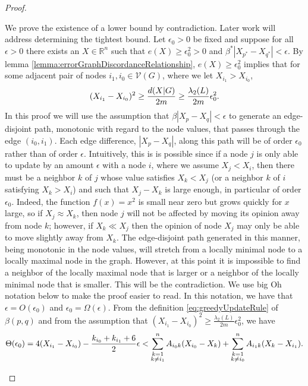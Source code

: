 \documentclass{article}
\theoremstyle{remark}
\newcommand{\R}[0]{\mathbb{R}}
\begin{document}
\begin{proof}
\begin{enumerate}
			We prove the existence of a lower bound by contradiction. Later work will address determining the tightest bound. Let $\epsilon_0>0$ be fixed and suppose for all $\epsilon>0$ there exists an $X\in\R^n$ such that $e(X)\geq\epsilon_0^2>0$ and $\beta^*|X_{p^*}-X_{q^*}|<\epsilon$. By lemma \ref{lemma:errorGraphDiscordanceRelationship}, $e(X)\geq\epsilon_0^2$ implies that for some adjacent pair of nodes $i_1,i_0\in\mathcal{V}(G)$, where we let $X_{i_1}>X_{i_0}$,
			\begin{equation}{\label{eq:lowerboundOnDiff}}
				(X_{i_1}-X_{i_0})^2 \geq \frac{d(X|G)}{2m}\geq\frac{\lambda_2(L)}{2m}\epsilon_0^2.
			\end{equation}
			In this proof we will use the assumption that $\beta|X_p-X_q|<\epsilon$ to generate an edge-disjoint path, monotonic with regard to the node values, that passes through the edge $(i_0,i_1)$. Each edge difference, $|X_p-X_q|$, along this path will be of order $\epsilon_0$ rather than of order $\epsilon$. Intuitively, this is is possible since if a node $j$ is only able to update by an amount $\epsilon$ with a node $i$, where we assume $X_j<X_i$, then there must be a neighbor $k$ of $j$ whose value satisfies $X_k<X_j$ (or a neighbor $k$ of $i$ satisfying $X_k>X_i$) and such that $X_j-X_k$ is large enough, in particular of order $\epsilon_0$. Indeed, the function $f(x)=x^2$ is small near zero but grows quickly for $x$ large, so if $X_j\approx X_k$, then node $j$ will not be affected by moving its opinion away from node $k$; however, if $X_k\ll X_j$ then the opinion of node $X_j$ may only be able to move slightly away from $X_k$. The edge-disjoint path generated in this manner, being monotonic in the node values, will stretch from a locally minimal node to a locally maximal node in the graph. However, at this point it is impossible to find a neighbor of the locally maximal node that is larger or a neighbor of the locally minimal node that is smaller. This will be the contradiction.
			We use big Oh notation below to make the proof easier to read.  In this notation, we have that $\epsilon = O(\epsilon_0)$ and $\epsilon_0 = \Omega(\epsilon)$. From the definition \ref{eq:greedyUpdateRule} of $\beta(p,q)$ and from the assumption that $(X_{i_1}-X_{i_0})^2\geq \frac{\lambda_{2}(L)}{2m}\epsilon_0^2$, we have
			\begin{equation}{\label{eq:approxInequality}}
				\Theta(\epsilon_0) = 4(X_{i_1}-X_{i_0}) - \frac{k_{i_0}+k_{i_1}+6}{2}\epsilon < \sum_{\substack{k=1\\k\neq i_1}}^nA_{i_0k}(X_{i_0}-X_k) + \sum_{\substack{k=1\\k\neq i_0}}^nA_{i_1k}(X_k-X_{i_1}).

\end{equation}
\end{enumerate}
\end{proof}
\end{document}

